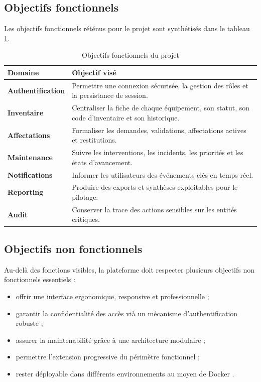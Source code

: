 ﻿\documentclass[12pt,a4paper,oneside]{report}
\begin{document}
\subsection{Objectifs fonctionnels}
Les objectifs fonctionnels réténus pour le projet sont synthétisés dans le tableau \ref{tab:objectifs-fonctionnels}.

\begin{table}[H]
\centering
\caption{Objectifs fonctionnels du projet}
\label{tab:objectifs-fonctionnels}
\begin{tabularx}{\textwidth}{>{\bfseries}p{3.4cm}X}
\toprule
Domaine & Objectif visé \\
\midrule
Authentification & Permettre une connexion sécurisée, la gestion des rôles et la persistance de session. \\
Inventaire & Centraliser la fiche de chaque équipement, son statut, son code d'inventaire et son historique. \\
Affectations & Formaliser les demandes, validations, affectations actives et restitutions. \\
Maintenance & Suivre les interventions, les incidents, les priorités et les états d'avancement. \\
Notifications & Informer les utilisateurs des événements clés en temps réel. \\
Reporting & Produire des exports et synthèses exploitables pour le pilotage. \\
Audit & Conserver la trace des actions sensibles sur les entités critiques. \\
\bottomrule
\end{tabularx}
\end{table}

\subsection{Objectifs non fonctionnels}
Au-delà des fonctions visibles, la plateforme doit respecter plusieurs objectifs non fonctionnels essentiels :
\begin{itemize}
  \item offrir une interface ergonomique, responsive et professionnelle ;
  \item garantir la confidentialité des accès vià un mécanisme d'authentification robuste ;
  \item assurer la maintenabilité grâce à une architecture modulaire ;
  \item permettre l'extension progressive du périmètre fonctionnel ;
  \item rester déployable dans différents environnements au moyen de Docker \cite{merkel2014docker,dockerdocs}.
\end{itemize}
\end{document}
